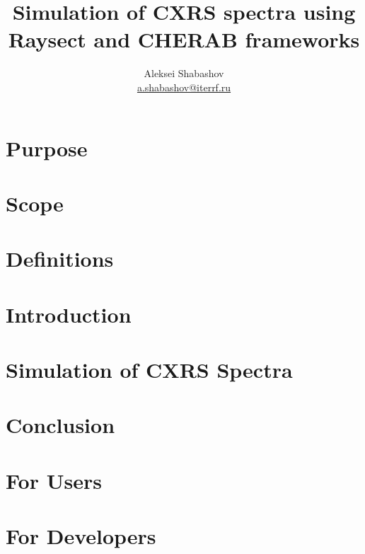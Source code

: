 \documentclass[a4paper,12pt,titlepage,english,draft]{article}
\title{Simulation of CXRS spectra using Raysect and CHERAB frameworks}
\author{Aleksei Shabashov \\ \href{mailto:a.shabashov@iterrf.ru}{a.shabashov@iterrf.ru}}
\date{}
\begin{document}
\maketitle
\tableofcontents%

\section{Purpose}%
\label{sec:purpose}


\section{Scope}%
\label{sec:scope}


\section{Definitions}%
\label{sec:definitions}


\section{Introduction}%
\label{sec:introduction}


\section{Simulation of CXRS Spectra}%
\label{sec:simulation}


\section{Conclusion}%
\label{sec:conclusion}


\printbibliography%

\begin{appendices}
    \section{For Users}%
    \label{app:users}
    

    \section{For Developers}%
    \label{app:developers}
    
\end{appendices}
\end{document}
